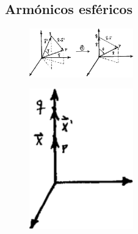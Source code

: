 \documentclass[10pt,oneside]{CBFT_book}
\begin{document}
\subsection{Armónicos esféricos}

\begin{figure}[htb]
	\begin{center}
	\includegraphics[width=0.4\textwidth]{images/fig_ft1_armesf1.pdf}	 
	\end{center}
	\caption{}
\end{figure} 

\begin{figure}[htb]
	\begin{center}
	\includegraphics[width=0.4\textwidth]{images/fig_ft1_armesf2.pdf}	 
	\end{center}
	\caption{}
\end{figure} 



\end{document}
